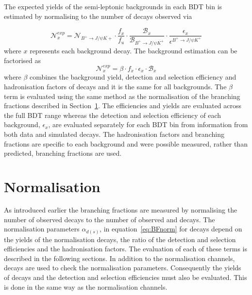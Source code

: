 {{The expected yields of the semi-leptonic backgrounds in each BDT bin is estimated by normalising to the number of \bujpsik decays observed via

\begin{equation}
\mathcal{N}^{exp}_{x} = \mathcal{N}_{B^{+} \to J/\psi K{+}} \cdot \frac{f_{x}}{f_{u}} \cdot \frac{\mathcal{B}_{x}}{\mathcal{B}_{B^{+} \to J/\psi K^{+}}} \cdot \frac{\epsilon_{x}}{\epsilon^{B^{+} \to J/\psi K^{+}}} 
\label{eq:BkgndPredict}
\end{equation}
where $x$ represents each background decay. The background estimation can be factorised as
\begin{equation}
\mathcal{N}^{exp}_{x} = \beta \cdot f_{x} \cdot \epsilon_{x} \cdot \mathcal{B}_{x}
\label{eq:BkgndPredict2}
\end{equation}
where $\beta$ combines the background yield, detection and selection efficiency and hadronisation factors of \bujpsik decays and it is the same for all backgrounds. The $\beta$ term is evaluated using the same method as the normalisation of the \bmumu branching fractions described in Section~\ref{sec:Normalisation}. The \bujpsik efficiencies and yields are evaluated across the full BDT range whereas the detection and selection efficiency of each background, $ \epsilon_{x}$, are evaluated separately for each BDT bin from information from both data and simulated decays. The hadronisation factors and branching fractions are specific to each background and were possible measured, rather than predicted, branching fractions are used. %

\section{Normalisation}
\label{sec:Normalisation}

As introduced earlier the \bmumu branching fractions are measured by normalising the number of observed \bmumu decays to the number of observed \bujpsik and \bdkpi decays. 
The normalisation parameters $\alpha_{d(s)}$, in equation~\ref{eq:BFnorm} for \bmumu decays depend on the yields of the normalisation decays, the ratio of the detection and selection efficiencies and the hadronisation factors. The evaluation of each of these terms is described in the following sections.
In addition to the normalisation channels, \bsjpsiphi decays are used to check the normalisation parameters. Consequently the yields of \bsjpisphi decays and the detection and selection efficiencies must also be evaluated. This is done in the same way as the normalisation channels.


}}
